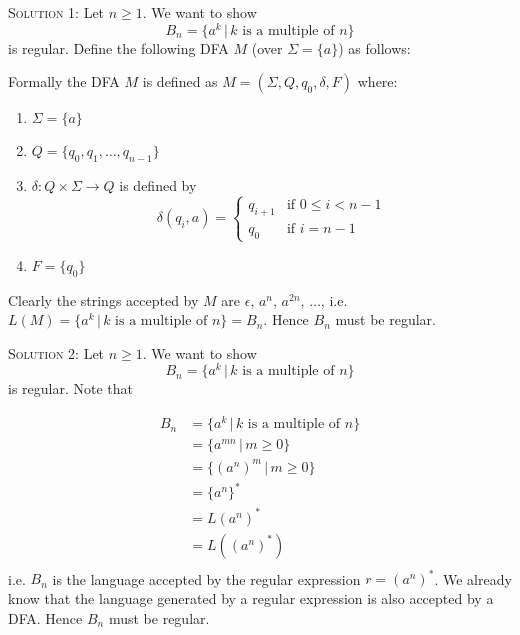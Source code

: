 \textsc{Solution 1:}
Let $n \geq 1$.
We want to show 
\[
B_n = \{a^k \,|\, k \text{ is a multiple of $n$} \}
\] 
is regular. 
Define the following DFA $M$ (over $\Sigma = \{a\}$) as follows:
\begin{center}
\end{center}
Formally the DFA $M$ is defined as
$M = (\Sigma, Q, q_0, \delta, F)$ where:
\begin{enumerate}[topsep=0in,parsep=0in]
\item $\Sigma = \{a\}$
\item $Q = \{q_0, q_1, \ldots, q_{n-1}\}$
\item $\delta : Q \times \Sigma \rightarrow Q$ is defined by 
 \[
 \delta(q_i, a)
 =
 \begin{cases}
 q_{i + 1} & \text{if } 0 \leq i < n - 1 \\
 q_0       & \text{if } i = n - 1
 \end{cases}
 \]
\item $F = \{q_0\}$
\end{enumerate}
Clearly the strings accepted by $M$ are $\epsilon$, $a^n$, $a^{2n}$, $\ldots$,
i.e. $L(M) = \{a^k \,|\, \text{$k$ is a multiple of $n$}\} = B_n$.
Hence $B_n$ must be regular.

\textsc{Solution 2:}
Let $n \geq 1$.
We want to show 
\[
B_n = \{a^k \,|\, k \text{ is a multiple of $n$} \}
\] 
is regular. Note that 

\begin{align*}
B_n 
&= \{a^k \,|\, k \text{ is a multiple of $n$} \} \\
&= \{a^{mn} \,|\, m \geq 0 \} \\
&= \{(a^n)^m \,|\, m \geq 0 \} \\
&= \{a^n\}^* \\
&= L(a^n)^* \\
&= L((a^n)^*) \\
\end{align*}
i.e. $B_n$ is the language accepted by the regular expression $r = (a^n)^*$.
We already know that the language generated by a regular expression is also
accepted by a DFA.
Hence $B_n$ must be regular.

